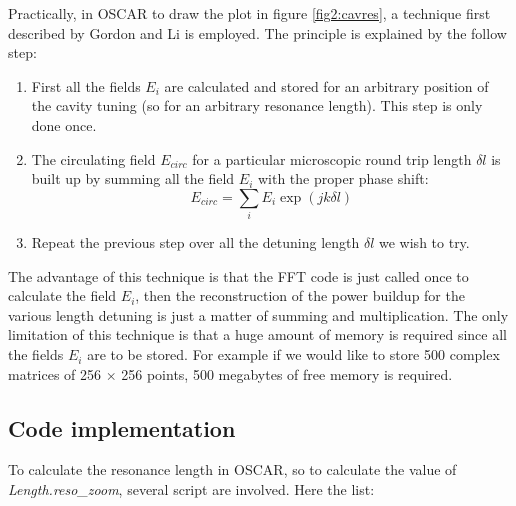 Practically, in OSCAR to draw the plot in figure \ref{fig2:cavres}, a technique first described by Gordon and Li\cite{Gordon} is employed. The principle is explained by the follow step:
\begin{enumerate}
  \item First all the fields $E_i$ are calculated and stored for an arbitrary position of the cavity tuning (so for an arbitrary resonance length). This step is only done once.
  \item The circulating field $E_{circ}$ for a particular microscopic round trip length $\delta l$ is built up by summing all the field $E_i$ with the proper phase shift:
      \begin{equation}
      \label{eq2:buildup}
      E_{circ} = \sum_i E_i \exp\left(j k \delta l \right)
      \end{equation}
  \item Repeat the previous step over all the detuning length $\delta l$ we wish to try.
\end{enumerate}

The advantage of this technique is that the FFT code is just called once to calculate the field $E_i$, then the reconstruction of the power buildup for the various length detuning is just a matter of summing and multiplication. The only limitation of this technique is that a huge amount of memory is required since all the fields $E_i$ are to be stored. For example if we would like to store 500 complex matrices of 256 $\times$ 256 points,  500 megabytes of free memory is required.


\subsection{Code implementation}
\label{sec2:2.2.3}
To calculate the resonance length in OSCAR, so to calculate the value of \textsl{Length.reso\_zoom}, several script are involved. Here the list:

